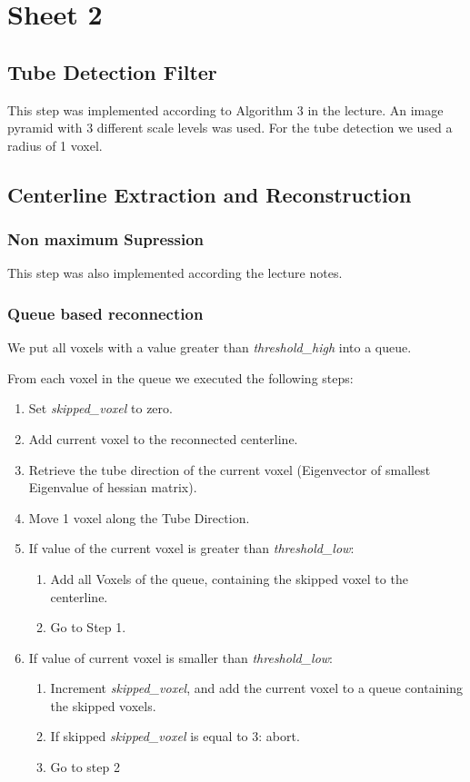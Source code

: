 \chapter{Sheet 2}

\section{Tube Detection Filter}

This step was implemented according to Algorithm 3 in the lecture.
An image pyramid with 3 different scale levels was used.
For the tube detection we used a radius of 1 voxel.

\section{Centerline Extraction and Reconstruction}

\subsection{Non maximum Supression}

This step was also implemented according the lecture notes.

\subsection{Queue based reconnection}

We put all voxels with a value greater than \textit{threshold\_high} into a queue.

From each voxel in the queue we executed the following steps:

\begin{enumerate}
 \item Set \textit{skipped\_voxel} to zero.
 \item Add current voxel to the reconnected centerline.
 \item Retrieve the tube direction of the current voxel (Eigenvector of smallest Eigenvalue of hessian matrix).
 \item Move 1 voxel along the Tube Direction.
 \item If value of the current voxel is greater than \textit{threshold\_low}:
  \begin{enumerate}
    \item Add all Voxels of the queue, containing the skipped voxel to the centerline.
    \item Go to Step 1.
  \end{enumerate}
 \item If value of current voxel is smaller than \textit{threshold\_low}:
  \begin{enumerate}
   \item Increment \textit{skipped\_voxel}, and add the current voxel to a queue
   containing the skipped voxels.
   \item If skipped \textit{skipped\_voxel} is equal to 3:  abort.
   \item Go to step 2   
  \end{enumerate}
\end{enumerate}


